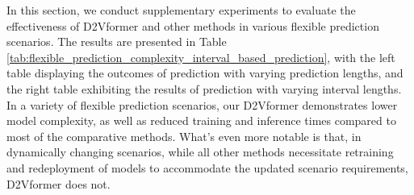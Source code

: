 \documentclass{article}
\begin{document}
In this section, we conduct supplementary experiments to evaluate the effectiveness of D2Vformer and other methods in various flexible prediction scenarios. The results are presented in Table \ref{tab:flexible_prediction_complexity_interval_based_prediction}, with the left table displaying the outcomes of prediction with varying prediction lengths, and the right table exhibiting the results of prediction with varying interval lengths.
In a variety of flexible prediction scenarios, our D2Vformer demonstrates lower model complexity, as well as reduced training and inference times compared to most of the comparative methods. What's even more notable is that, in dynamically changing scenarios, while all other methods necessitate retraining and redeployment of models to accommodate the updated scenario requirements, D2Vformer does not.




\end{document}
